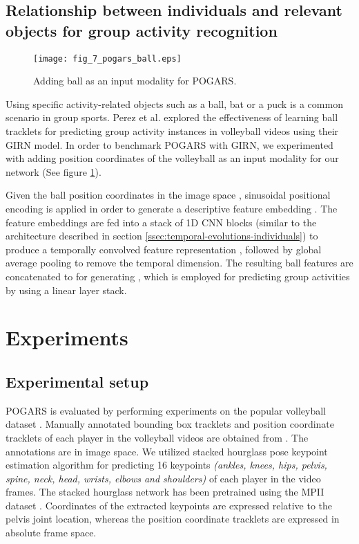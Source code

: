 \documentclass[a4paper,fleqn]{cas-dc}
\begin{document}
\subsection{ Relationship between individuals and relevant objects for group activity recognition}
\label{ssec:ball-indv-relationship}

\begin{figure}
  \texttt{[image: fig\_7\_pogars\_ball.eps]}
  \caption{Adding ball as an input modality for POGARS.}
  \label{fig:pogars-ball}
\end{figure}

Using specific activity-related objects such as a ball, bat or a puck is a common scenario in group sports. 
Perez et al.\cite{Perez2020_SkeletonBased_GIRN} explored the effectiveness of learning ball tracklets for predicting group activity instances in volleyball videos using their GIRN model. 
In order to benchmark POGARS with GIRN, we experimented with adding position coordinates of the volleyball as an input modality for our network (See figure \ref{fig:pogars-ball}).

Given the ball position coordinates in the image space \textit{} , sinusoidal positional encoding \cite{Vaswani2017_attentionAll} is applied in order to generate a descriptive feature embedding \textit{}. 
The feature embeddings are fed into a stack of 1D CNN blocks (similar to the architecture described in section \ref{ssec:temporal-evolutions-individuals}) to produce a temporally convolved feature representation \textit{}, followed by global average pooling to remove the temporal dimension. 
The resulting ball features are concatenated to  for generating \textit{}, which is employed for predicting group activities by using a linear layer stack.


\section{Experiments}
\label{sec:experiments}

\subsection{Experimental setup}
\label{ssec:experimental-setup}

POGARS is evaluated by performing experiments on the popular volleyball dataset \cite{Ibrahim2015_volleyballPaper}. 
Manually annotated bounding box tracklets and position coordinate tracklets of each player in the volleyball videos are obtained from \cite{Sendo2019_HeatmappingOfPeople}. 
The annotations are in image space.
We utilized stacked hourglass pose keypoint estimation algorithm \cite{Newell2016_stackedHourGlass} for predicting 16 keypoints \textit{(ankles, knees, hips, pelvis, spine, neck, head, wrists, elbows and shoulders)} of each player in the video frames. 
The stacked hourglass network has been pretrained using the MPII dataset \cite{Andriluka2014_humanpose}. 
Coordinates of the extracted keypoints are expressed relative to the pelvis joint location, whereas the position coordinate tracklets are expressed in absolute frame space.
\end{document}
